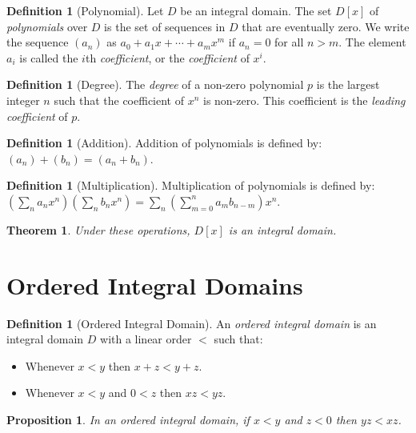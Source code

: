 \documentclass{article}
\newtheorem{proposition}[axiom]{Proposition}
\newtheorem{theorem}[axiom]{Theorem}
\theoremstyle{definition}
\newtheorem{definition}[axiom]{Definition}
\begin{document}
    \begin{definition}[Polynomial]
        Let $D$ be an integral domain. The set $D[x]$ of \emph{polynomials} over $D$ is the set of sequences
        in $D$ that are eventually zero. We write the sequence $(a_n)$ as 
        $a_0 + a_1 x + \cdots +
        a_m x^m$ if $a_n = 0$ for all $n > m$. The element $a_i$ is called the $i$th \emph{coefficient}, or the \emph{coefficient} of
        $x^i$.
    \end{definition}

    \begin{definition}[Degree]
        The \emph{degree} of a non-zero polynomial $p$ is the largest integer $n$ such that the coefficient of
        $x^n$ is non-zero. This coefficient is the \emph{leading coefficient} of $p$.
    \end{definition}

    \begin{definition}[Addition]
        Addition of polynomials is defined by: $(a_n) + (b_n) = (a_n + b_n)$.
    \end{definition}

    \begin{definition}[Multiplication]
        Multiplication of polynomials is defined by: $(\sum_n a_n x^n) (\sum_n b_n x^n) = \sum_n (\sum_{m=0}^n a_m b_{n-m}) x^n$.
    \end{definition}

    \begin{theorem}
        Under these operations, $D[x]$ is an integral domain.
    \end{theorem}

    \section{Ordered Integral Domains}

    \begin{definition}[Ordered Integral Domain]
        An \emph{ordered integral domain} is an integral domain $D$ with a linear order $<$ such that:
        \begin{itemize}
            \item Whenever $x < y$ then $x + z < y + z$.
            \item Whenever $x < y$ and $0 < z$ then $xz < yz$.
        \end{itemize}
    \end{definition}

    \begin{proposition}
        In an ordered integral domain, if $x < y$ and $z < 0$ then $yz < xz$.
    \end{proposition}
\end{document}
